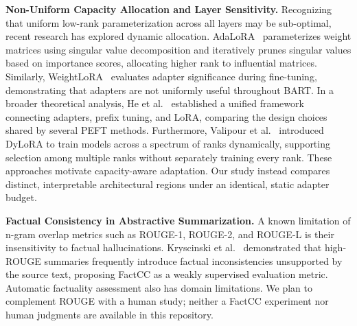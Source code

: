 \documentclass[11pt, letterpaper]{article}
\begin{document}
\textbf{Non-Uniform Capacity Allocation and Layer Sensitivity.} Recognizing that uniform low-rank parameterization across all layers may be sub-optimal, recent research has explored dynamic allocation. AdaLoRA~\cite{zhang2023adalora} parameterizes weight matrices using singular value decomposition and iteratively prunes singular values based on importance scores, allocating higher rank to influential matrices. Similarly, WeightLoRA~\cite{veprikov2026weightlora} evaluates adapter significance during fine-tuning, demonstrating that adapters are not uniformly useful throughout BART. In a broader theoretical analysis, He et al.~\cite{he2022unified} established a unified framework connecting adapters, prefix tuning, and LoRA, comparing the design choices shared by several PEFT methods. Furthermore, Valipour et al.~\cite{valipour2023dylora} introduced DyLoRA to train models across a spectrum of ranks dynamically, supporting selection among multiple ranks without separately training every rank. These approaches motivate capacity-aware adaptation. Our study instead compares distinct, interpretable architectural regions under an identical, static adapter budget.

\textbf{Factual Consistency in Abstractive Summarization.} A known limitation of n-gram overlap metrics such as ROUGE-1, ROUGE-2, and ROUGE-L is their insensitivity to factual hallucinations. Kryscinski et al.~\cite{kryscinski2020evaluating} demonstrated that high-ROUGE summaries frequently introduce factual inconsistencies unsupported by the source text, proposing FactCC as a weakly supervised evaluation metric. Automatic factuality assessment also has domain limitations. We plan to complement ROUGE with a human study; neither a FactCC experiment nor human judgments are available in this repository.
\end{document}

